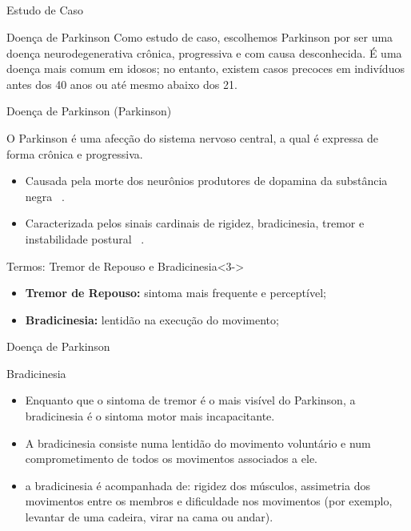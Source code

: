 \documentclass{beamer}
\begin{document}
\subsection{}
\begin{frame}{Estudo de Caso}
  \begin{block}{Doença de Parkinson}
   Como estudo de caso, escolhemos Parkinson por ser uma doença neurodegenerativa crônica, progressiva e com causa desconhecida. É uma doença mais comum em idosos; no
entanto, existem casos precoces em indivíduos antes dos 40 anos ou até mesmo abaixo dos 21.
  \end{block}
\end{frame}


\begin{frame}{Doença de Parkinson (Parkinson)}
  \begin{block}{}
    O Parkinson é uma afecção do sistema nervoso central, a qual é expressa de forma crônica e progressiva. 
      \begin{itemize}[<+->]
       \item Causada pela morte dos neurônios produtores de dopamina da substância negra ~\cite{protpar010}. 
       \item Caracterizada pelos sinais cardinais de rigidez, bradicinesia, tremor e instabilidade postural ~\cite{jankovic2008}.
      \end{itemize}
  \end{block}
  \begin{block}{Termos: Tremor de Repouso e Bradicinesia}<3->
      \begin{itemize}
       \item \textbf{Tremor de Repouso:} sintoma mais frequente e perceptível;
       \item \textbf{Bradicinesia:} lentidão na execução do movimento;
      \end{itemize}
  \end{block}
\end{frame}


\begin{frame}{Doença de Parkinson}
  \begin{block}{Bradicinesia}
      \begin{itemize}[<+->]
	\item Enquanto que o sintoma de tremor é o mais visível do Parkinson, a bradicinesia é o sintoma motor mais incapacitante. 
	\item A bradicinesia consiste numa lentidão do movimento voluntário e num comprometimento de todos os movimentos associados a ele.
	\item a bradicinesia é acompanhada de: rigidez dos músculos, assimetria dos movimentos entre os membros e dificuldade nos movimentos (por exemplo, levantar de uma cadeira, virar na cama ou andar).
      \end{itemize}
  \end{block}
\end{frame}
  
\end{document}
